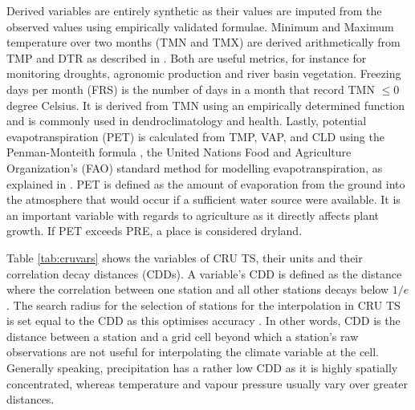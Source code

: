 \documentclass[a4paper,12pt]{article}
\theoremstyle{plain}
\theoremstyle{definition}
\theoremstyle{definition}
\theoremstyle{definition}
\theoremstyle{definition}
\begin{document}
Derived variables are entirely synthetic as their values are imputed from the observed values using empirically validated formulae. Minimum and Maximum temperature over two months (TMN and TMX) are derived arithmetically from TMP and DTR as described in \citet{harris2014}. Both are useful metrics, for instance for monitoring droughts, agronomic production and river basin vegetation. Freezing days per month (FRS) is the number of days in a month that record TMN $\leq 0$ degree Celsius. It is derived from TMN using an empirically determined function and is commonly used in dendroclimatology and health. Lastly, potential evapotranspiration (PET) is calculated from TMP, VAP, and CLD using the Penman-Monteith formula \citep{allen1998}, the United Nations Food and Agriculture Organization's (FAO) standard method for modelling evapotranspiration, as explained in \citet[][pp. 1071 - 1072]{ekstrom2007}. PET is defined as the amount of evaporation from the ground into the atmosphere that would occur if a sufficient water source were available. It is an important variable with regards to agriculture as it directly affects plant growth. If PET exceeds PRE, a place is considered dryland.

Table \ref{tab:cruvars} shows the variables of CRU TS, their units and their correlation decay distances (CDDs). A variable's CDD is defined as the distance where the correlation between one station and all other stations decays below $1/e$. The search radius for the selection of stations for the interpolation in CRU TS is set equal to the CDD as this optimises accuracy \citep{harris2020}. In other words, CDD is the distance between a station and a grid cell beyond which a station's raw observations are not useful for interpolating the climate variable at the cell. Generally speaking, precipitation has a rather low CDD as it is highly spatially concentrated, whereas temperature and vapour pressure usually vary over greater distances.
\end{document}
